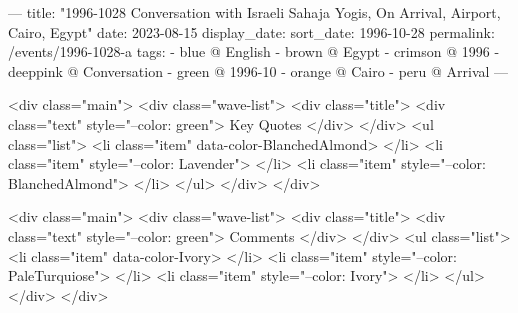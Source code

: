 ---
title: "1996-1028 Conversation with Israeli Sahaja Yogis, On Arrival, Airport, Cairo, Egypt"
date: 2023-08-15
display_date: 
sort_date: 1996-10-28
permalink: /events/1996-1028-a
tags:
  - blue @ English
  - brown @ Egypt
  - crimson @ 1996
  - deeppink @ Conversation
  - green @ 1996-10
  - orange @ Cairo
  - peru @ Arrival
---

<div class="main">
  <div class="wave-list">
    <div class="title">
      <div class="text" style="--color: green">
        Key Quotes
      </div>
    </div>
    <ul class="list">
        <li class="item" data-color-BlanchedAlmond>
        </li>
        <li class="item" style="--color: Lavender">
        </li>
        <li class="item" style="--color: BlanchedAlmond">
        </li>
      </ul>
  </div>
</div>

<div class="main">
  <div class="wave-list">
    <div class="title">
      <div class="text" style="--color: green">
        Comments
      </div>
    </div>
    <ul class="list">
        <li class="item" data-color-Ivory>
        </li>
        <li class="item" style="--color: PaleTurquiose">
        </li>
        <li class="item" style="--color: Ivory">
        </li>
      </ul>
  </div>
</div>